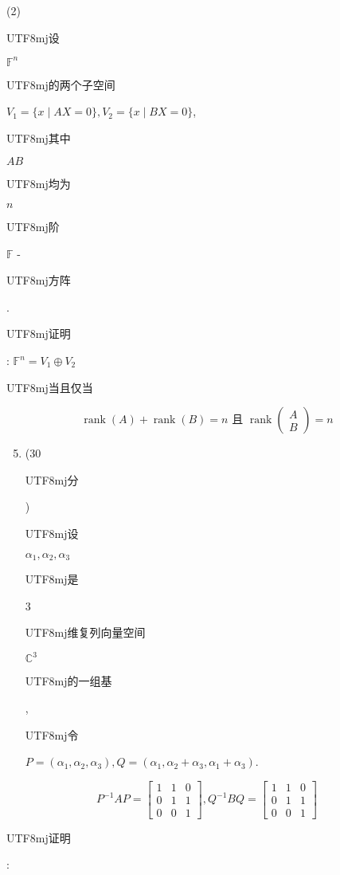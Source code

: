 \documentclass[10pt]{article}
\begin{document}
(2) \begin{CJK}{UTF8}{mj}设\end{CJK} $\mathbb{F}^{n}$ \begin{CJK}{UTF8}{mj}的两个子空间\end{CJK} $V_{1}=\{x \mid A X=0\}, V_{2}=\{x \mid B X=0\}$, \begin{CJK}{UTF8}{mj}其中\end{CJK} $A B$ \begin{CJK}{UTF8}{mj}均为\end{CJK} $n$ \begin{CJK}{UTF8}{mj}阶\end{CJK} $\mathbb{F}$ - \begin{CJK}{UTF8}{mj}方阵\end{CJK}. \begin{CJK}{UTF8}{mj}证明\end{CJK}: $\mathbb{F}^{n}=V_{1} \oplus V_{2}$ \begin{CJK}{UTF8}{mj}当且仅当\end{CJK}
$$
\operatorname{rank}(A)+\operatorname{rank}(B)=n \text { 且 } \operatorname{rank}\left(\begin{array}{c}
A \\
B
\end{array}\right)=n
$$

\begin{enumerate}
  \setcounter{enumi}{4}
  \item (30 \begin{CJK}{UTF8}{mj}分\end{CJK}) \begin{CJK}{UTF8}{mj}设\end{CJK} $\alpha_{1}, \alpha_{2}, \alpha_{3}$ \begin{CJK}{UTF8}{mj}是\end{CJK} 3 \begin{CJK}{UTF8}{mj}维复列向量空间\end{CJK} $\mathbb{C}^{3}$ \begin{CJK}{UTF8}{mj}的一组基\end{CJK}, \begin{CJK}{UTF8}{mj}令\end{CJK} $P=\left(\alpha_{1}, \alpha_{2}, \alpha_{3}\right), Q=\left(\alpha_{1}, \alpha_{2}+\alpha_{3}, \alpha_{1}+\alpha_{3}\right)$.
\end{enumerate}
$$
P^{-1} A P=\left[\begin{array}{lll}
1 & 1 & 0 \\
0 & 1 & 1 \\
0 & 0 & 1
\end{array}\right], Q^{-1} B Q=\left[\begin{array}{lll}
1 & 1 & 0 \\
0 & 1 & 1 \\
0 & 0 & 1
\end{array}\right]
$$
\begin{CJK}{UTF8}{mj}证明\end{CJK}:
\end{document}
